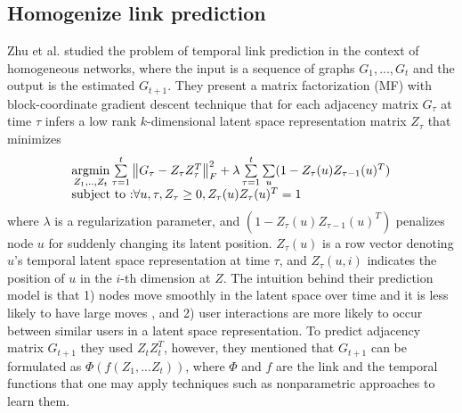 
\subsection{Homogenize link prediction}

Zhu et al. \cite{Zhu2016} studied the problem of temporal link prediction in the context of homogeneous networks, where the input is a sequence of graphs $G_1, ..., G_t$ and the output is the estimated $G_{t+1}$. They present a matrix factorization (MF) with block-coordinate gradient descent technique that for each adjacency matrix $G_\tau$ at time $\tau$ infers a low rank $k$-dimensional latent space representation matrix $Z_\tau$ that minimizes %
\begin{equation}\label{latentOrigEqu}
    \begin{array}{l}
\operatorname*{argmin}\limits_{Z_1, .., Z_t}\sum\limits_{\tau=1}^{t}\left \| G_\tau-Z_{\tau}Z_{\tau}^T \right \|^2_F+\lambda \sum\limits_{\tau=1}^{t}\sum\limits_{u}(1-Z_{\tau}(u)Z_{\tau-1}(u)^T) 
\\
\text{subject to :} \forall u,\tau,Z_{\tau}\geq 0, Z_{\tau}(u)Z_{\tau}(u)^T=1
    \end{array}
\end{equation}
where $\lambda$ is a regularization parameter, and  $(1-Z_{\tau}(u)Z_{\tau-1}(u)^T)$ penalizes node $u$ for suddenly changing its latent position. %
$Z_\tau(u)$ is a row vector denoting $u$'s temporal latent space representation at time $\tau$, and $Z_\tau(u,i)$ indicates the position of $u$ in the $i$-th dimension at $Z$. The intuition behind their prediction model is that 1) nodes move smoothly in the latent space over time and it is less likely to have large moves \cite{sarkar2005dynamic,zhang2014inferring}, and 2) user interactions are more likely to occur between similar users in a latent space representation. To predict adjacency matrix $G_{t+1}$ they used $Z_tZ_t^T$, however, they mentioned that $G_{t+1}$ can be formulated as $\Phi(f(Z_1,...Z_t))$, where $\Phi$ and $f$ are the link and the temporal functions that one may apply techniques such as nonparametric approaches \cite{Sarkar:2012} to learn them.

